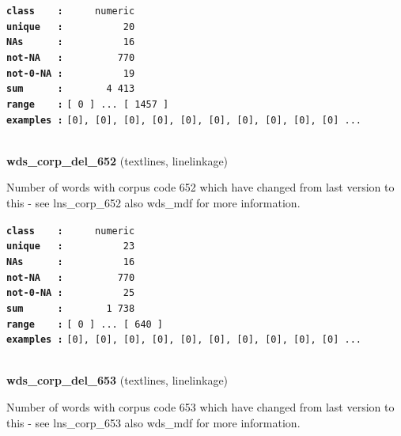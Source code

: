\documentclass[]{article}
\begin{document}
\textbf{\texttt{class\ \ \ \ :}} \texttt{~~~~~numeric}\\
\textbf{\texttt{unique\ \ \ :}} \texttt{~~~~~~~~~~20}\\
\textbf{\texttt{NAs\ \ \ \ \ \ :}} \texttt{~~~~~~~~~~16}\\
\textbf{\texttt{not-NA\ \ \ :}} \texttt{~~~~~~~~~770}\\
\textbf{\texttt{not-0-NA\ :}} \texttt{~~~~~~~~~~19}\\
\textbf{\texttt{sum\ \ \ \ \ \ :}} \texttt{~~~~~~~4~413}\\
\textbf{\texttt{range\ \ \ \ :}}
\texttt{{[}\ 0\ {]}\ ...\ {[}\ 1457\ {]}}\\
\textbf{\texttt{examples\ :}}
\texttt{{[}0{]},\ {[}0{]},\ {[}0{]},\ {[}0{]},\ {[}0{]},\ {[}0{]},\ {[}0{]},\ {[}0{]},\ {[}0{]},\ {[}0{]}\ ...}\\

~

\textbf{wds\_corp\_del\_652} (textlines, linelinkage)

Number of words with corpus code 652 which have changed from last
version to this - see lns\_corp\_652 also wds\_mdf for more information.

\textbf{\texttt{class\ \ \ \ :}} \texttt{~~~~~numeric}\\
\textbf{\texttt{unique\ \ \ :}} \texttt{~~~~~~~~~~23}\\
\textbf{\texttt{NAs\ \ \ \ \ \ :}} \texttt{~~~~~~~~~~16}\\
\textbf{\texttt{not-NA\ \ \ :}} \texttt{~~~~~~~~~770}\\
\textbf{\texttt{not-0-NA\ :}} \texttt{~~~~~~~~~~25}\\
\textbf{\texttt{sum\ \ \ \ \ \ :}} \texttt{~~~~~~~1~738}\\
\textbf{\texttt{range\ \ \ \ :}}
\texttt{{[}\ 0\ {]}\ ...\ {[}\ 640\ {]}}\\
\textbf{\texttt{examples\ :}}
\texttt{{[}0{]},\ {[}0{]},\ {[}0{]},\ {[}0{]},\ {[}0{]},\ {[}0{]},\ {[}0{]},\ {[}0{]},\ {[}0{]},\ {[}0{]}\ ...}\\

~

\textbf{wds\_corp\_del\_653} (textlines, linelinkage)

Number of words with corpus code 653 which have changed from last
version to this - see lns\_corp\_653 also wds\_mdf for more information.
\end{document}
